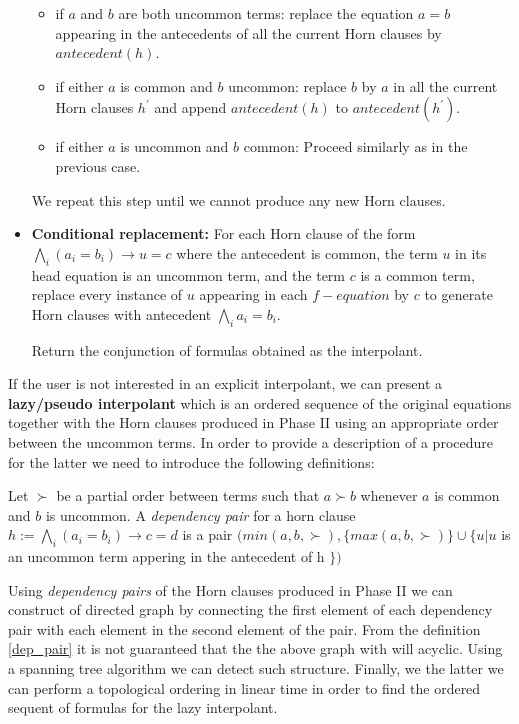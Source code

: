 \begin{itemize}
    \begin{itemize}
      \item if $a$ and $b$ are both uncommon terms:
        replace the equation $a = b$ appearing in the antecedents
        of all the current Horn clauses by $antecedent(h)$.
      \item if either $a$ is common and $b$ uncommon: replace $b$ by $a$
        in all the current Horn clauses $h^{'}$ and append $antecedent(h)$ to 
        $antecedent(h^{'})$.
      \item if either $a$ is uncommon and $b$ common: Proceed similarly as in the
        previous case.
    \end{itemize}

    We repeat this step until we cannot produce any new Horn clauses. 

  \item \textbf{Conditional replacement:} 
    For each Horn clause of the form $\bigwedge_i(a_i = b_i) 
    \rightarrow u = c$ 
    where the antecedent is common, the term $u$ in its 
    head equation is an uncommon term,
    and the term $c$ is a common term, 
    replace every instance of $u$ appearing in each 
    $f-equation$ by $c$ to generate Horn clauses with 
    antecedent $\bigwedge_i a_i = b_i$.

    Return the conjunction of formulas obtained 
    as the interpolant.
\end{itemize}

If the user is not interested in an explicit interpolant, 
we can present a \textbf{lazy/pseudo interpolant}
which is an ordered sequence of the original equations 
together with the Horn clauses produced in Phase II 
using an appropriate order between the uncommon terms. In order to
provide a description of a procedure for the latter we need
to introduce the following definitions:

\begin{definition}\label{dep_pair}
  Let $\succ$ be a partial order between terms 
  such that $a \succ b$ whenever 
  $a$ is common and $b$ is uncommon. A \emph{dependency pair}
  for a horn clause $h := \bigwedge_i (a_i = b_i) \rightarrow c = d$
  is a pair $(min(a, b, \succ), \{max(a, b, \succ)\} \cup \{ u | u$ 
  is an uncommon term appering in the antecedent of h $\})$
\end{definition}

Using \emph{dependency pairs} of the Horn clauses 
produced in Phase II
we can construct of directed graph 
by connecting the first element of each dependency pair with each 
element in the second element of the pair.
From the definition \ref{dep_pair} it is not guaranteed that the
the above graph with will acyclic. Using a spanning tree algorithm
we can detect such structure. Finally, we the latter we can perform 
a topological ordering in linear time in order to find the 
ordered sequent of formulas for the lazy interpolant.

